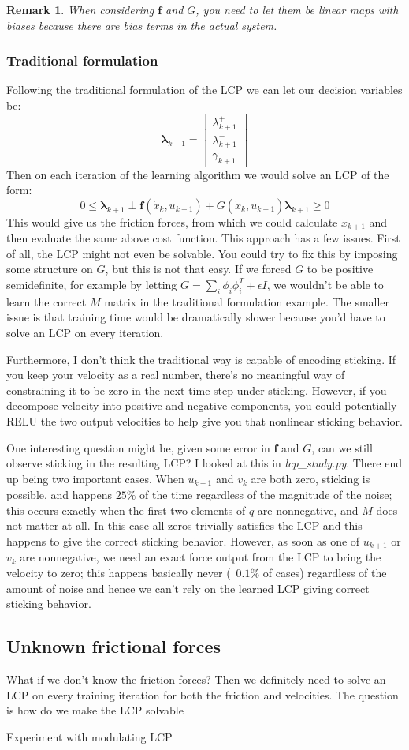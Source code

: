 \documentclass{article}
\newtheorem{remark}{Remark}
\renewcommand{\vec}[1]{\boldsymbol{#1}}
\begin{document}
\begin{remark}
    When considering $\vec{f}$ and $G$, you need to let them be linear maps with biases because there are bias terms in the actual system. 
\end{remark}

\subsubsection{Traditional formulation}
Following the traditional formulation of the LCP we can let our decision variables be:
\[
    \vec{\lambda}_{k+1} =
    \begin{bmatrix}
        \lambda^+_{k+1} \\
        \lambda^-_{k+1} \\
        \gamma_{k+1}
    \end{bmatrix}
\]
Then on each iteration of the learning algorithm we would solve an LCP of the form:
\[
    0 \leq \vec{\lambda}_{k+1} \perp \vec{f}(\dot x_k, u_{k+1}) + G(\dot x_k, u_{k+1}) \vec{\lambda}_{k+1} \geq 0
\]
This would give us the friction forces, from which we could calculate $\dot x_{k+1}$ and then evaluate the same above cost function. This approach has a few issues. First of all, the LCP might not even be solvable. You could try to fix this by imposing some structure on $G$, but this is not that easy. If we forced $G$ to be positive semidefinite, for example by letting $G = \sum _i \phi_i \phi_i^T + \epsilon I$, we wouldn't be able to learn the correct $M$ matrix in the traditional formulation example. The smaller issue is that training time would be dramatically slower because you'd have to solve an LCP on every iteration.

Furthermore, I don't think the traditional way is capable of encoding sticking. If you keep your velocity as a real number, there's no meaningful way of constraining it to be zero in the next time step under sticking. However, if you decompose velocity into positive and negative components, you could potentially RELU the two output velocities to help give you that nonlinear sticking behavior.

One interesting question might be, given some error in $\vec{f}$ and $G$, can we still observe sticking in the resulting LCP? I looked at this in \textit{lcp\_study.py}. There end up being two important cases. When $u_{k+1}$ and $v_k$ are both zero, sticking is possible, and happens $25\%$ of the time regardless of the magnitude of the noise; this occurs exactly when the first two elements of $q$ are nonnegative, and $M$ does not matter at all. In this case all zeros trivially satisfies the LCP and this happens to give the correct sticking behavior. However, as soon as one of $u_{k+1}$ or $v_k$ are nonnegative, we need an exact force output from the LCP to bring the velocity to zero; this happens basically never (~$0.1\%$ of cases) regardless of the amount of noise and hence we can't rely on the learned LCP giving correct sticking behavior.

\subsection{Unknown frictional forces}
What if we don't know the friction forces? Then we definitely need to solve an LCP on every training iteration for both the friction and velocities. The question is how do we make the LCP solvable

Experiment with modulating LCP 
\end{document}
